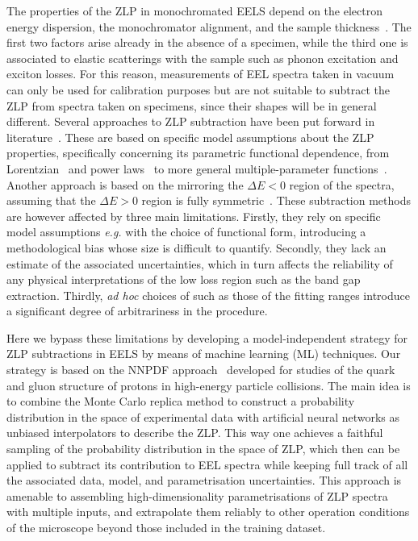 The properties of the ZLP in monochromated EELS depend on the electron energy dispersion,
the monochromator alignment, and the sample thickness~\cite{Park:2008, Stoger:2008}.
%
The first two factors arise already in the absence of a specimen, while the third one is associated
to elastic scatterings with the sample such as  phonon excitation and exciton losses.
%
For this reason, measurements of EEL spectra taken in vacuum can only be used for calibration purposes
but are not suitable
to subtract the ZLP from spectra taken on specimens, since their shapes will be in general
different.
%
Several approaches to ZLP subtraction have been put forward in 
literature~\cite{Rafferty:2000, Stoger:2008, Egerton:1996}.
%
These are based on specific model assumptions about the ZLP properties, specifically
concerning its parametric functional dependence, from Lorentzian~\cite{Dorneich:1998}
and power laws~\cite{Erni:2005} to more general multiple-parameter functions~\cite{Benthem:2001}.
%
Another approach is based on the mirroring the $\Delta E <0$ region of the spectra, assuming
that the $\Delta E>0$ region is fully symmetric~\cite{Lazar:2003}.
%
These  subtraction methods are however affected by three main limitations.
%
Firstly, they rely on specific model assumptions {\it e.g.} with
the choice of functional form, introducing a methodological
bias whose size is difficult to quantify.
%
Secondly, they lack an estimate of the associated uncertainties, which in turn affects
the reliability of any physical interpretations of the low loss region such as the band gap extraction.
%
Thirdly, {\it ad hoc} choices of such as those of the fitting ranges introduce a significant degree of
arbitrariness in the procedure.

Here we bypass these limitations by developing a model-independent strategy
for ZLP subtractions in EELS by means of machine learning (ML) techniques.
%
Our strategy is based on the NNPDF approach~\cite{Ball:2008by,Ball:2012cx,Ball:2014uwa,Ball:2017nwa}
developed for studies
of the quark and gluon structure of protons in high-energy particle collisions.
%
The main idea is to combine the  Monte Carlo replica  method to construct a probability
distribution in the space of experimental data with artificial
neural networks as unbiased interpolators to describe the ZLP.
%
This way one achieves
a faithful sampling of the probability distribution in the space of ZLP,
which then can be applied to subtract its contribution to EEL spectra while keeping
full track of all the associated
data, model, and parametrisation uncertainties.
%
This approach is amenable to assembling high-dimensionality parametrisations
of ZLP spectra with multiple inputs, and extrapolate them reliably
to other operation conditions of the microscope beyond those included
in the training dataset.

